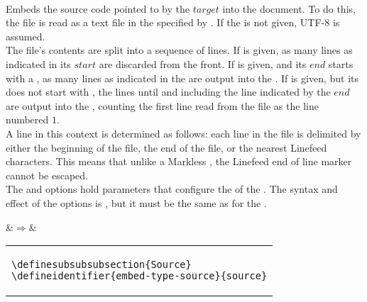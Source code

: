  \\

Embeds the source code pointed to by the \inline$target$ into the document. To do this, the file is read as a text file in the  specified by . If the  is not given, UTF-8  is assumed. \\

The file's contents are split into a sequence of lines. If  is given, as many lines as indicated in its \inline$start$  are discarded from the front. If  is given, and its \inline$end$  starts with a , as many lines as indicated in the  are output into the . If  is given, but its  does not start with , the lines until and including the line indicated by the \inline$end$  are output into the , counting the first line read from the file as the line numbered \inline$1$. \\

A line in this context is determined as follows: each line in the file is delimited by either the beginning of the file, the end of the file, or the nearest Linefeed  characters. This means that unlike a Markless , the Linefeed  end of line marker cannot be escaped. \\

The  and  options hold parameters that configure the  of the . The syntax and effect of the options is , but it must be the same as for the  . \\

\begin{examples}
  \begin{examplesource}
  \end{examplesource}
  &$\Rightarrow$&\\
  \begin{tabular}{@{}l@{}}
\begin{lstlisting}[style=codestyle,showstringspaces=false]
\definesubsubsubsection{Source}
\defineidentifier{embed-type-source}{source}
\end{lstlisting}
  \end{tabular}
\end{examples}


